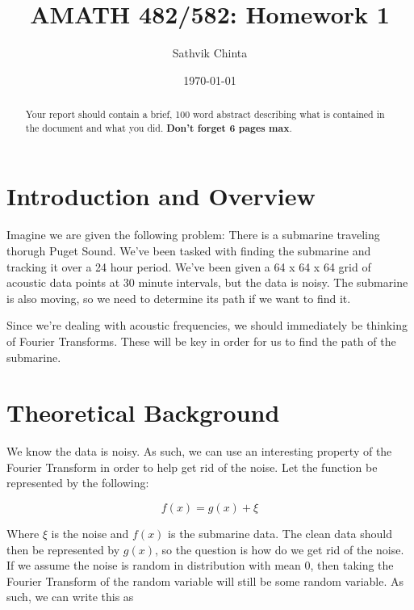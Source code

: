 \documentclass[11pt]{amsart}
\title{AMATH 482/582: Homework 1}
\author{Sathvik Chinta} %
\date{\today} %
\begin{document}
\maketitle 

\begin{abstract}
    Your report should contain a brief, 100 word abstract describing what is contained in 
    the document and what you did. {\bf Don't forget 6 pages max}.
\end{abstract}


\section{Introduction and Overview}\label{sec:Introduction}
Imagine we are given the following problem:
There is a submarine traveling thorugh Puget Sound. We've been tasked with finding the submarine
and tracking it over a 24 hour period. We've been given a 64 x 64 x 64 grid of acoustic data points at 
30 minute intervals, but the data is noisy. The submarine is also moving, so we need to determine 
its path if we want to find it. 

Since we're dealing with acoustic frequencies, we should immediately be thinking of Fourier Transforms.
These will be key in order for us to find the path of the submarine. 



\section{Theoretical Background}\label{sec:theory}
We know the data is noisy. As such, we can use an interesting property of the Fourier Transform in order
to help get rid of the noise. Let the function be represented by the following: 

\[f(x) = g(x) + \xi\]

Where $\xi$ is the noise and $f(x)$ is the submarine data. The clean data should then be represented
by $g(x)$, so the question is how do we get rid of the noise. If we assume the noise is random 
in distribution with mean 0, then taking the Fourier Transform of the random variable will still be some random variable.
As such, we can write this as 
\end{document}

